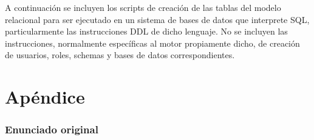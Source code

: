\documentclass[a4paper,11pt]{article}
\begin{document}
A continuación se incluyen los scripts de creación de las tablas del modelo
relacional para ser ejecutado en un sistema de bases de datos que interprete
SQL, particularmente las instrucciones DDL de dicho lenguaje. No se incluyen
las instrucciones, normalmente específicas al motor propiamente dicho, de
creación de usuarios, roles, schemas y bases de datos correspondientes.



\clearpage

\part{Apéndice}
\appendix

\section{Enunciado original}\label{sec:enunciado}

\end{document}
